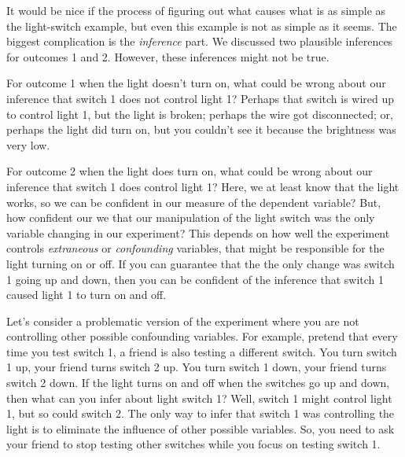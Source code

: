 It would be nice if the process of figuring out what causes what is as simple as the light-switch example, but even this example is not as simple as it seems. The biggest complication is the \emph{inference} part. We discussed two plausible inferences for outcomes 1 and 2.  However, these inferences might not be true. 

For outcome 1 when the light doesn't turn on, what could be wrong about our inference that switch 1 does not control light 1? Perhaps that switch is wired up to control light 1, but the light is broken; perhaps the wire got disconnected; or, perhaps the light did turn on, but you couldn't see it because the brightness was very low.

For outcome 2 when the light does turn on, what could be wrong about our inference that switch 1 does control light 1? Here, we at least know that the light works, so we can be confident in our measure of the dependent variable? But, how confident our we that our manipulation of the light switch was the only variable changing in our experiment? This depends on how well the experiment controls \emph{extraneous} or \emph{confounding} variables, that might be responsible for the light turning on or off. If you can guarantee that the the only change was switch 1 going up and down, then you can be confident of the inference that switch 1 caused light 1 to turn on and off. 

Let's consider a problematic version of the experiment where you are not controlling other possible confounding variables. For example, pretend that every time you test switch 1, a friend is also testing a different switch. You turn switch 1 up, your friend turns switch 2 up. You turn switch 1 down, your friend turns switch 2 down. If the light turns on and off when the switches go up and down, then what can you infer about light switch 1? Well, switch 1 might control light 1, but so could switch 2. The only way to infer that switch 1 was controlling the light is to eliminate the influence of other possible variables. So, you need to ask your friend to stop testing other switches while you focus on testing switch 1. 

